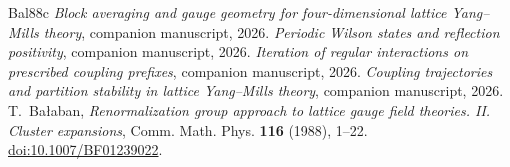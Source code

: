 \documentclass[11pt,letterpaper,reqno]{amsart}
\numberwithin{equation}{section}
\theoremstyle{definition}
\theoremstyle{remark}
\begin{document}
\begin{thebibliography}{Bal88c}
\small
{} \emph{Block averaging and gauge geometry for four-dimensional lattice Yang--Mills theory}, companion manuscript, 2026.
 \emph{Periodic Wilson states and reflection positivity}, companion manuscript, 2026.
 \emph{Iteration of regular interactions on prescribed coupling prefixes}, companion manuscript, 2026.
 \emph{Coupling trajectories and partition stability in lattice Yang--Mills theory}, companion manuscript, 2026.
 T.~Ba{\l}aban, \emph{Renormalization group approach to lattice gauge field theories. II. Cluster expansions}, Comm. Math. Phys. \textbf{116} (1988), 1--22. \href{https://doi.org/10.1007/BF01239022}{doi:10.1007/BF01239022}.
\end{thebibliography}
\end{document}
